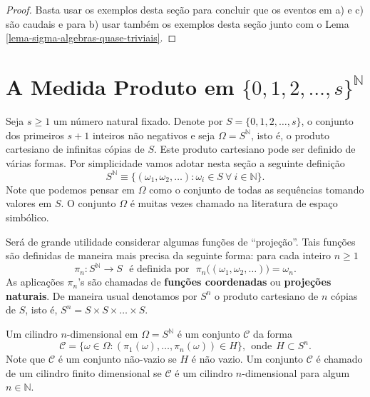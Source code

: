 \begin{proof}
Basta usar os exemplos desta seção para concluir que os eventos
em a) e c) são caudais e para b) usar também os exemplos desta
seção  junto com o Lema \ref{lema-sigma-algebras-quase-triviais}. 
\end{proof}



















\section{A Medida Produto em $\{0,1,2,\ldots,s\}^{\mathbb{N}}$}

Seja $s\geq 1$ um número natural fixado. 
Denote por $S=\{0,1,2,\ldots,s\}$, 
o conjunto dos primeiros $s+1$ inteiros não negativos 
e seja $\Omega = S^{\mathbb{N}}$, isto é,
o produto cartesiano de infinitas cópias de $S$. 
Este produto cartesiano pode ser definido 
de várias formas. Por simplicidade vamos 
adotar nesta seção a seguinte definição 
\[
S^{\mathbb{N}}
\equiv 
\{
	(\omega_1,\omega_2,\ldots)
	:\omega_i\in S\ \forall \ i\in \mathbb{N}
\}.
\]
Note que podemos pensar em $\Omega$ como 
o conjunto de todas as sequências tomando 
valores em $S$. O conjunto $\Omega$ é 
muitas vezes chamado na literatura de 
espaço simbólico.

Será de grande utilidade considerar algumas
funções de ``projeção''. 
Tais funções são definidas de maneira mais precisa
da seguinte forma: para cada inteiro $n\geq 1$
\[
	\pi_n: S^{\mathbb{N}}\to S
	\ \ \
	\text{é definida por}\ \ \
	\pi_n\big( (\omega_1,\omega_2,\ldots)  \big)
	=
	\omega_n.
\]
As aplicações $\pi_n$'s são chamadas de 
{\bf funções coordenadas} ou {\bf projeções naturais}.
De maneira usual denotamos por $S^n$ o produto cartesiano
de $n$ cópias de $S$, isto é, $S^n=S\times S\times\ldots \times S$.

Um cilindro $n$-dimensional em $\Omega=S^{\mathbb{N}}$ é um conjunto 
$\mathcal{C}$ da forma 
\[
\mathcal{C}
=
\{
\omega\in \Omega:
(\pi_1(\omega),\ldots,\pi_n(\omega)) \in H
\},
\ \ 
\text{onde}\ \ H\subset S^n.
\]
Note que $\mathcal{C}$ é um conjunto não-vazio 
se $H$ é não vazio.
Um conjunto $\mathcal{C}$ é chamado de 
um cilindro finito dimensional se $\mathcal{C}$
é um cilindro $n$-dimensional para algum $n\in\mathbb{N}$. 


